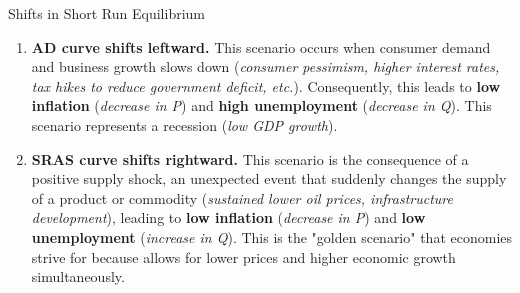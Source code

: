 \documentclass[10pt]{article}
\begin{document}
\begin{core}[label=core:shifts]{Shifts in Short Run Equilibrium}
\begin{enumerate}
{\begin{axis}


          \end{axis} 
        }{AD shifts rightward; associated with unsustainable economic growth}{fig:ad_right}{0.85}

        \item \textbf{AD curve shifts leftward.} This scenario occurs when consumer demand and business growth slows down (\textit{consumer pessimism, higher interest rates, tax hikes to reduce government deficit, etc.}). Consequently, this leads to \textbf{low inflation} (\textit{decrease in P}) and \textbf{high unemployment} (\textit{decrease in Q}). This scenario represents a recession (\textit{low GDP growth}).


        \item \textbf{SRAS curve shifts rightward.} This scenario is the consequence of a positive supply shock, an unexpected event that suddenly changes the supply of a product or commodity (\textit{sustained lower oil prices, infrastructure development}), leading to \textbf{low inflation} (\textit{decrease in P}) and \textbf{low unemployment} (\textit{increase in Q}). This is the "golden scenario" that economies strive for because allows for lower prices and higher economic growth simultaneously.


\end{enumerate}
\end{core}
\end{document}
